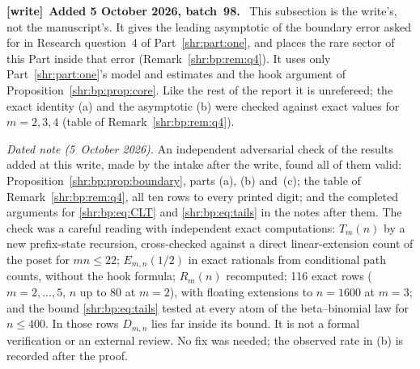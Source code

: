 \documentclass[11pt,letterpaper]{article}
\numberwithin{equation}{section}
\theoremstyle{definition}
\newcommand{\1}{\mathbf 1}
\newenvironment{writenote}[1][]{\par\smallskip\begingroup\small
 \noindent\textbf{[write]}\if\relax\detokenize{#1}\relax\else~\textbf{#1.}\fi\ }%
 {\par\endgroup\smallskip}
\begin{document}
\begin{writenote}[Added 5 October 2026, batch~98]
This subsection is the write's, not the manuscript's. It gives the leading
asymptotic of the boundary error asked for in Research question~4 of
Part~\ref{shr:part:one}, and places the rare sector of this Part inside
that error (Remark~\ref{shr:bp:rem:q4}). It uses only
Part~\ref{shr:part:one}'s model and estimates and the hook argument of
Proposition~\ref{shr:bp:prop:core}. Like the rest of the report it is
unrefereed; the exact identity (a) and the asymptotic (b) were checked
against exact values for $m=2,3,4$ (table of Remark~\ref{shr:bp:rem:q4}).

\emph{Dated note (5~October 2026).} An independent adversarial check of
the results added at this write, made by the intake after the write, found
all of them valid: Proposition~\ref{shr:bp:prop:boundary}, parts (a), (b)
and~(c); the table of Remark~\ref{shr:bp:rem:q4}, all ten rows to every
printed digit; and the completed arguments for \eqref{shr:bp:eq:CLT} and
\eqref{shr:bp:eq:tails} in the notes after them. The check was a careful
reading with independent exact computations: $T_m(n)$ by a new prefix-state
recursion, cross-checked against a direct linear-extension count of the
poset for $mn\le22$; $E_{m,n}(1/2)$ in exact rationals from conditional
path counts, without the hook formula; $R_m(n)$ recomputed; 116 exact rows
($m=2,\ldots,5$, $n$ up to $80$ at $m=2$), with floating extensions to
$n=1600$ at $m=3$; and the bound \eqref{shr:bp:eq:tails} tested at every
atom of the beta--binomial law for $n\le400$. In those rows $D_{m,n}$ lies far
inside its bound. It is not a formal verification or an external review.
No fix was needed; the observed rate in (b) is recorded after the proof.
\end{writenote}
\end{document}
